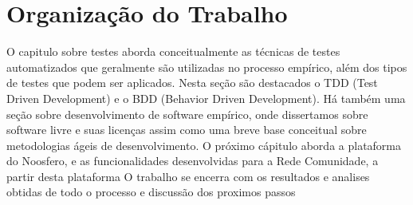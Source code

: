 	 
	 
	\section{Organização do Trabalho}
	 
	O capitulo sobre testes aborda conceitualmente as técnicas de testes automatizados que geralmente
	são utilizadas no processo empírico, além dos tipos de testes que podem ser aplicados. Nesta seção são 
	destacados o TDD (Test Driven Development) e o BDD (Behavior Driven Development).
	Há também uma seção sobre desenvolvimento de software empírico, onde dissertamos sobre software livre 
	e suas licenças assim como uma breve base conceitual sobre metodologias ágeis de desenvolvimento.
	O próximo cápitulo aborda a plataforma do Noosfero, e as funcionalidades desenvolvidas para a Rede Comunidade,
	a partir desta plataforma
	O trabalho se encerra com os resultados e analises obtidas de todo o processo e discussão dos proximos passos


